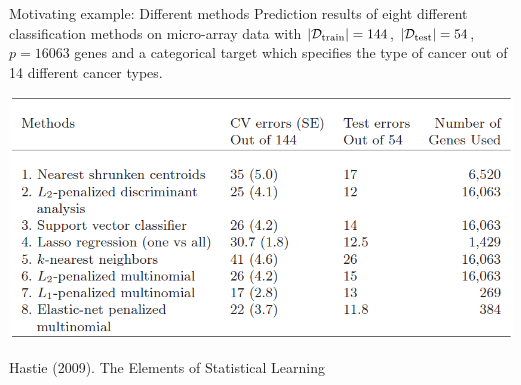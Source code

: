 
\begin{vbframe}{Motivating example: Different methods}
Prediction results of eight different classification methods on micro-array data with $| \mathcal{D}_{\text{train}} | = 144$, $| \mathcal{D}_{\text{test}} | = 54$, $p=16 063$ genes and a categorical target which specifies the type of cancer out of 14 different cancer types.

\begin{center}
\includegraphics{figure_man/tibshirani_tab_18_1.png}

\footnotesize{Hastie (2009). The Elements of Statistical Learning}
\end{center}
\end{vbframe}

